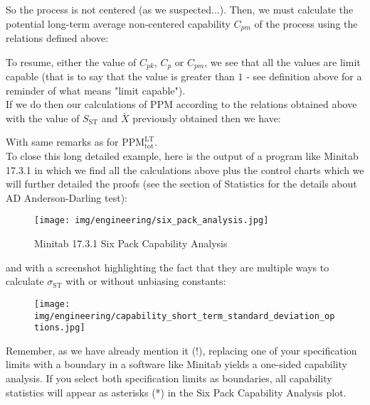 	\pagebreak
	\begin{tcolorbox}[colframe=black,colback=white,sharp corners]
	
	So the process is not centered (as we suspected...). Then, we must calculate the potential long-term average non-centered capability $C_{pm}$ of the process using the relations defined above:
	
	To resume, either the value of $C_{pk}$, $C_p$ or $C_{pm}$, we see that all the values are limit capable (that is to say that the value is greater than $1$ - see definition above for a reminder of what means "limit capable").\\
	
	If we do then our calculations of PPM according to the relations obtained above with the value of $S_{\text{ST}}$ and $\bar{X}$ previously obtained then we have:
	
	With same remarks as for $\text{PPM}_{\text{tot}}^{\text{LT}}$.\\
	
	To close this long detailed example, here is the output of a program like Minitab 17.3.1 in which we find all the calculations above plus the control charts which we will further detailed the proofs (see the section of Statistics for the details about AD Anderson-Darling test):
	\begin{figure}[H]
		\centering
		\texttt{[image: img/engineering/six\_pack\_analysis.jpg]}
		\caption[]{Minitab 17.3.1 Six Pack Capability Analysis}
	\end{figure}
	\end{tcolorbox}
	
	\pagebreak
	\begin{tcolorbox}[colframe=black,colback=white,sharp corners]
	and with a screenshot highlighting the fact that they are multiple ways to calculate $\sigma_{\text{ST}}$ with or without unbiasing constants:
	\begin{figure}[H]
		\centering
		\texttt{[image: img/engineering/capability\_short\_term\_standard\_deviation\_options.jpg]}
	\end{figure}
	\begin{tcolorbox}[title=Remark,colframe=black,arc=10pt]
	Remember, as we have already mention it (!), replacing one of your specification limits with a boundary in a software like Minitab yields a one-sided capability analysis. If you select both specification limits as boundaries, all capability statistics will appear as asterisks (*) in the Six Pack Capability Analysis plot. 
	\end{tcolorbox}
	\end{tcolorbox}
	
